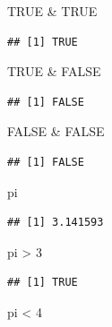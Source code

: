 \documentclass[
]{book}
\newenvironment{Shaded}{\begin{snugshade}}{\end{snugshade}}
\newcommand{\ConstantTok}[1]{\textcolor[rgb]{0.00,0.00,0.00}{#1}}
\newcommand{\DecValTok}[1]{\textcolor[rgb]{0.00,0.00,0.81}{#1}}
\newcommand{\NormalTok}[1]{#1}
\newcommand{\SpecialCharTok}[1]{\textcolor[rgb]{0.00,0.00,0.00}{#1}}
\theoremstyle{definition}
\theoremstyle{definition}
\theoremstyle{definition}
\theoremstyle{definition}
\theoremstyle{remark}
\begin{document}
\begin{Shaded}
\begin{Highlighting}[]
\ConstantTok{TRUE} \SpecialCharTok{\&} \ConstantTok{TRUE}
\end{Highlighting}
\end{Shaded}

\begin{verbatim}
## [1] TRUE
\end{verbatim}

\begin{Shaded}
\begin{Highlighting}[]
\ConstantTok{TRUE} \SpecialCharTok{\&} \ConstantTok{FALSE}
\end{Highlighting}
\end{Shaded}

\begin{verbatim}
## [1] FALSE
\end{verbatim}

\begin{Shaded}
\begin{Highlighting}[]
\ConstantTok{FALSE} \SpecialCharTok{\&} \ConstantTok{FALSE}
\end{Highlighting}
\end{Shaded}

\begin{verbatim}
## [1] FALSE
\end{verbatim}

\begin{Shaded}
\begin{Highlighting}[]
\NormalTok{pi}
\end{Highlighting}
\end{Shaded}

\begin{verbatim}
## [1] 3.141593
\end{verbatim}

\begin{Shaded}
\begin{Highlighting}[]
\NormalTok{pi }\SpecialCharTok{\textgreater{}} \DecValTok{3}
\end{Highlighting}
\end{Shaded}

\begin{verbatim}
## [1] TRUE
\end{verbatim}

\begin{Shaded}
\begin{Highlighting}[]
\NormalTok{pi }\SpecialCharTok{\textless{}} \DecValTok{4}
\end{Highlighting}
\end{Shaded}
\end{document}
